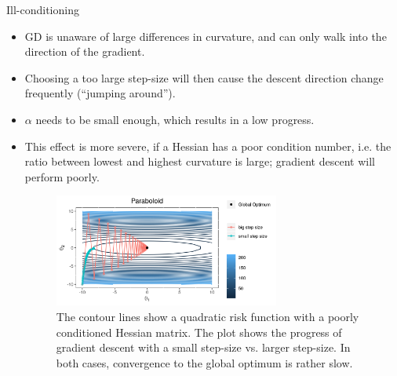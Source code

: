 \begin{vbframe} {Ill-conditioning}


\begin{itemize}

  \item GD is unaware of large differences in curvature, and can only walk into the direction of the gradient.  
  \item Choosing a too large step-size will then cause the descent direction change frequently (\enquote{jumping around}).
  \item $\alpha$ needs to be small enough, which results in a low progress.
  
  \framebreak
  
  \item This effect is more severe, if a Hessian has a poor condition number, i.e. the ratio between lowest and highest curvature is large; gradient descent will perform poorly. 
  \begin{figure}
  \captionsetup{font=footnotesize,labelfont=footnotesize, labelfont = bf}
  \begin{center}
  \includegraphics[width=0.7\textwidth]{plots/big_small_stepsize.png}
  \end{center}
  \caption{The contour lines show a quadratic risk function with a poorly conditioned Hessian matrix. The plot shows the progress of gradient descent with a small step-size vs. larger step-size. In both cases, convergence to the global optimum is rather slow. }
  \end{figure}


\end{itemize}
\end{vbframe}
